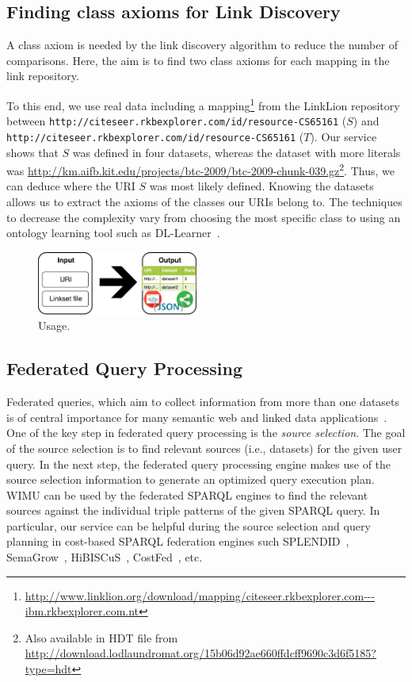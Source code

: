 \subsection{Finding class axioms for Link Discovery}

A class axiom is needed by the link discovery algorithm to reduce the number of comparisons. 
Here, the aim is to find two class axioms for each mapping in the link repository.

To this end, we use real data including a mapping\footnote{\url{http://www.linklion.org/download/mapping/citeseer.rkbexplorer.com---ibm.rkbexplorer.com.nt}} from the Link\-Lion repository~\cite{linklion2014} between \texttt{http://citeseer.rkbexplorer.com/id/resource-CS65161} ($S$) and \texttt{http://citeseer.rkbexplorer.com/id/resource-CS65161} ($T$). 
Our service shows that $S$ was defined in four datasets, whereas the dataset with more literals was \url{http://km.aifb.kit.edu/projects/btc-2009/btc-2009-chunk-039.gz}\footnote{Also available in HDT file from \url{http://download.lodlaundromat.org/15b06d92ae660ffdcff9690c3d6f5185?type=hdt}}. 
Thus, we can deduce where the URI $S$ was most likely defined.
Knowing the datasets allows us to extract the axioms of the classes our URIs belong to.
The techniques to decrease the complexity vary from choosing the most specific class to using an ontology learning tool such as DL-Learner~\cite{lehmann2009dl}.

\begin{figure}[htb] 
	\centering
	\includegraphics[width=150pt]{img/usage.pdf}
	\caption{Usage.}
	\label{fig:usage}
\end{figure}

\subsection{Federated Query Processing}
Federated queries, which aim to collect information from more than one datasets is of central importance for many semantic web and linked data applications~\cite{saleem2013fostering,bigtcga2014}. One of the key step in federated query processing is the \emph{source selection}. The goal of the source selection is to find relevant sources (i.e., datasets) for the given user query. In the next step, the federated query processing engine makes use of the source selection information to generate an optimized query execution plan. WIMU can be used by the federated SPARQL engines to find the relevant sources against the individual triple patterns of the given SPARQL query. In particular, our service can be helpful during the source selection and query planning in cost-based SPARQL federation engines such SPLENDID~\cite{splendid2011}, SemaGrow~\cite{semagrow2015}, HiBISCuS~\cite{hibiscus2014}, CostFed~\cite{costfed2017}, etc.  

